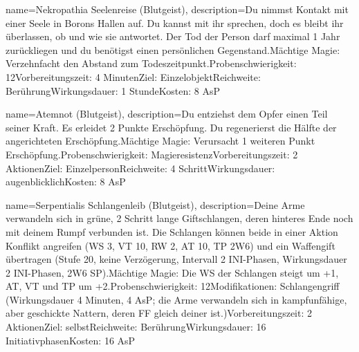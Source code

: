 {
    name={Nekropathia Seelenreise (Blutgeist)},
    description={Du nimmst Kontakt mit einer Seele in Borons Hallen auf. Du kannst mit ihr sprechen, doch es bleibt ihr überlassen, ob und wie sie antwortet. Der Tod der Person darf maximal 1 Jahr zurückliegen und du benötigst einen persönlichen Gegenstand.\newline Mächtige Magie: Verzehnfacht den Abstand zum Todeszeitpunkt.\newline Probenschwierigkeit: 12\newline Vorbereitungszeit: 4 Minuten\newline Ziel: Einzelobjekt\newline Reichweite: Berührung\newline Wirkungsdauer: 1 Stunde\newline Kosten: 8 AsP}
}


{
    name={Atemnot (Blutgeist)},
    description={Du entziehst dem Opfer einen Teil seiner Kraft. Es erleidet 2 Punkte Erschöpfung. Du regenerierst die Hälfte der angerichteten Erschöpfung.\newline Mächtige Magie: Verursacht 1 weiteren Punkt Erschöpfung.\newline Probenschwierigkeit: Magieresistenz\newline Vorbereitungszeit: 2 Aktionen\newline Ziel: Einzelperson\newline Reichweite: 4 Schritt\newline Wirkungsdauer: augenblicklich\newline Kosten: 8 AsP}
}


{
    name={Serpentialis Schlangenleib (Blutgeist)},
    description={Deine Arme verwandeln sich in grüne, 2 Schritt lange Giftschlangen, deren hinteres Ende noch mit deinem Rumpf verbunden ist. Die Schlangen können beide in einer Aktion Konflikt angreifen (WS 3, VT 10, RW 2, AT 10, TP 2W6) und ein Waffengift übertragen (Stufe 20, keine Verzögerung, Intervall 2 INI-Phasen, Wirkungsdauer 2 INI-Phasen, 2W6 SP).\newline Mächtige Magie: Die WS der Schlangen steigt um +1, AT, VT und TP um +2.\newline Probenschwierigkeit: 12\newline Modifikationen: Schlangengriff (Wirkungsdauer 4 Minuten, 4 AsP; die Arme verwandeln sich in kampfunfähige, aber geschickte Nattern, deren FF gleich deiner ist.)\newline Vorbereitungszeit: 2 Aktionen\newline Ziel: selbst\newline Reichweite: Berührung\newline Wirkungsdauer: 16 Initiativphasen\newline Kosten: 16 AsP}
}


